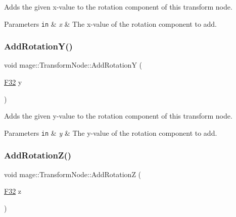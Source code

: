 Adds the given x-\/value to the rotation component of this transform node.


\begin{DoxyParams}[1]{Parameters}
\mbox{\tt in}  & {\em x} & The x-\/value of the rotation component to add. \\
\hline
\end{DoxyParams}
\hypertarget{structmage_1_1_transform_node_a609c4d2cfb34f43f365851ab7092fbe1}{}\label{structmage_1_1_transform_node_a609c4d2cfb34f43f365851ab7092fbe1} 
\subsubsection{\texorpdfstring{Add\+Rotation\+Y()}{AddRotationY()}}
{\footnotesize\ttfamily void mage\+::\+Transform\+Node\+::\+Add\+RotationY (\begin{DoxyParamCaption}\item[{\hyperlink{namespacemage_aa97e833b45f06d60a0a9c4fc22ae02c0}{F32}}]{y }\end{DoxyParamCaption})\hspace{0.3cm}{\ttfamily [noexcept]}}

Adds the given y-\/value to the rotation component of this transform node.


\begin{DoxyParams}[1]{Parameters}
\mbox{\tt in}  & {\em y} & The y-\/value of the rotation component to add. \\
\hline
\end{DoxyParams}
\hypertarget{structmage_1_1_transform_node_acb9abe975906ff1df858933de4d7cdbc}{}\label{structmage_1_1_transform_node_acb9abe975906ff1df858933de4d7cdbc} 
\subsubsection{\texorpdfstring{Add\+Rotation\+Z()}{AddRotationZ()}}
{\footnotesize\ttfamily void mage\+::\+Transform\+Node\+::\+Add\+RotationZ (\begin{DoxyParamCaption}\item[{\hyperlink{namespacemage_aa97e833b45f06d60a0a9c4fc22ae02c0}{F32}}]{z }\end{DoxyParamCaption})\hspace{0.3cm}{\ttfamily [noexcept]}}

